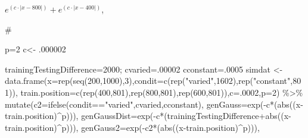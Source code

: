 \documentclass[
  letterpaper,
  DIV=11,
  numbers=noendperiod]{scrartcl}
\newenvironment{Shaded}{\begin{snugshade}}{\end{snugshade}}
\newcommand{\AttributeTok}[1]{\textcolor[rgb]{0.40,0.45,0.13}{#1}}
\newcommand{\CommentTok}[1]{\textcolor[rgb]{0.37,0.37,0.37}{#1}}
\newcommand{\DecValTok}[1]{\textcolor[rgb]{0.68,0.00,0.00}{#1}}
\newcommand{\FunctionTok}[1]{\textcolor[rgb]{0.28,0.35,0.67}{#1}}
\newcommand{\NormalTok}[1]{\textcolor[rgb]{0.00,0.23,0.31}{#1}}
\newcommand{\OtherTok}[1]{\textcolor[rgb]{0.00,0.23,0.31}{#1}}
\newcommand{\SpecialCharTok}[1]{\textcolor[rgb]{0.37,0.37,0.37}{#1}}
\newcommand{\StringTok}[1]{\textcolor[rgb]{0.13,0.47,0.30}{#1}}
\begin{document}
\(e^{(c\cdot|x-800|)} + e^{(c\cdot|x-400|)}\),

\begin{Shaded}
\begin{Highlighting}[]
\CommentTok{\# }

\NormalTok{p}\OtherTok{=}\DecValTok{2}
\NormalTok{c}\OtherTok{\textless{}{-}}\NormalTok{ .}\DecValTok{000002}

\NormalTok{trainingTestingDifference}\OtherTok{=}\DecValTok{2000}\NormalTok{;}
\NormalTok{cvaried}\OtherTok{=}\NormalTok{.}\DecValTok{00002}
\NormalTok{cconstant}\OtherTok{=}\NormalTok{.}\DecValTok{0005}
\NormalTok{simdat }\OtherTok{\textless{}{-}} \FunctionTok{data.frame}\NormalTok{(}\AttributeTok{x=}\FunctionTok{rep}\NormalTok{(}\FunctionTok{seq}\NormalTok{(}\DecValTok{200}\NormalTok{,}\DecValTok{1000}\NormalTok{),}\DecValTok{3}\NormalTok{),}\AttributeTok{condit=}\FunctionTok{c}\NormalTok{(}\FunctionTok{rep}\NormalTok{(}\StringTok{"varied"}\NormalTok{,}\DecValTok{1602}\NormalTok{),}\FunctionTok{rep}\NormalTok{(}\StringTok{"constant"}\NormalTok{,}\DecValTok{801}\NormalTok{)),}
                     \AttributeTok{train.position=}\FunctionTok{c}\NormalTok{(}\FunctionTok{rep}\NormalTok{(}\DecValTok{400}\NormalTok{,}\DecValTok{801}\NormalTok{),}\FunctionTok{rep}\NormalTok{(}\DecValTok{800}\NormalTok{,}\DecValTok{801}\NormalTok{),}\FunctionTok{rep}\NormalTok{(}\DecValTok{600}\NormalTok{,}\DecValTok{801}\NormalTok{)),}\AttributeTok{c=}\NormalTok{.}\DecValTok{0002}\NormalTok{,}\AttributeTok{p=}\DecValTok{2}\NormalTok{) }\SpecialCharTok{\%\textgreater{}\%}
                     \FunctionTok{mutate}\NormalTok{(}\AttributeTok{c2=}\FunctionTok{ifelse}\NormalTok{(condit}\SpecialCharTok{==}\StringTok{"varied"}\NormalTok{,cvaried,cconstant),}
                            \AttributeTok{genGauss=}\FunctionTok{exp}\NormalTok{(}\SpecialCharTok{{-}}\NormalTok{c}\SpecialCharTok{*}\NormalTok{(}\FunctionTok{abs}\NormalTok{((x}\SpecialCharTok{{-}}\NormalTok{train.position)}\SpecialCharTok{\^{}}\NormalTok{p))),}
                            \AttributeTok{genGaussDist=}\FunctionTok{exp}\NormalTok{(}\SpecialCharTok{{-}}\NormalTok{c}\SpecialCharTok{*}\NormalTok{(trainingTestingDifference}\SpecialCharTok{+}\FunctionTok{abs}\NormalTok{((x}\SpecialCharTok{{-}}\NormalTok{train.position)}\SpecialCharTok{\^{}}\NormalTok{p))),}
                            \AttributeTok{genGauss2=}\FunctionTok{exp}\NormalTok{(}\SpecialCharTok{{-}}\NormalTok{c2}\SpecialCharTok{*}\NormalTok{(}\FunctionTok{abs}\NormalTok{((x}\SpecialCharTok{{-}}\NormalTok{train.position)}\SpecialCharTok{\^{}}\NormalTok{p))),}

\end{Highlighting}
\end{Shaded}
\end{document}
